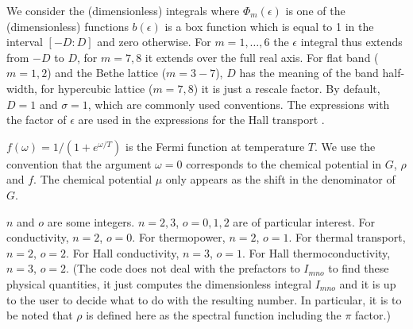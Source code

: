 \documentclass[prb,amsmath,amssymb,onecolumn,nopacs,floatfix,longbibliography]{revtex4-1}
\begin{document}
We consider the (dimensionless) integrals
%
%
where $\Phi_m(\epsilon)$ is one of the (dimensionless) functions
%
%
$b(\epsilon)$ is a box function which is equal to 1 in the interval
$[-D:D]$ and zero otherwise. For $m=1,\ldots,6$ the $\epsilon$
integral thus extends from $-D$ to $D$, for $m=7,8$ it extends over
the full real axis. For flat band ($m=1,2$) and the Bethe lattice
($m=3-7$), $D$ has the meaning of the band half-width, for
hypercubic lattice ($m=7,8$) it is just a rescale factor. By default,
$D=1$ and $\sigma=1$, which are commonly used conventions. The
expressions with the factor of $\epsilon$ are used in the expressions
for the Hall transport \cite{arsenault2013}.

$f(\omega)=1/(1+e^{\omega/T})$ is the Fermi function at temperature
$T$. We use the convention that the argument $\omega=0$ corresponds to
the chemical potential in $G$, $\rho$ and $f$. The chemical potential
$\mu$ only appears as the shift in the denominator of $G$.

$n$ and $o$ are some integers. $n=2,3$, $o=0,1,2$ are of particular
interest. For conductivity, $n=2$, $o=0$. For thermopower, $n=2$,
$o=1$. For thermal transport, $n=2$, $o=2$. For Hall conductivity,
$n=3$, $o=1$. For Hall thermoconductivity, $n=3$, $o=2$. (The code
does not deal with the prefactors to $I_{mno}$ to find these physical
quantities, it just computes the dimensionless integral $I_{mno}$ and
it is up to the user to decide what to do with the resulting number.
In particular, it is to be noted that $\rho$ is defined here as the
spectral function including the $\pi$ factor.)
\end{document}

